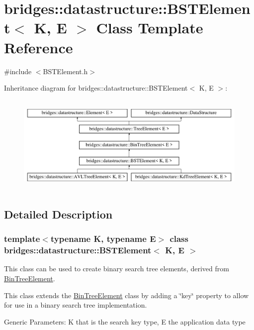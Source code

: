 \hypertarget{classbridges_1_1datastructure_1_1_b_s_t_element}{}\section{bridges\+::datastructure\+::B\+S\+T\+Element$<$ K, E $>$ Class Template Reference}
\label{classbridges_1_1datastructure_1_1_b_s_t_element}


{\ttfamily \#include $<$B\+S\+T\+Element.\+h$>$}

Inheritance diagram for bridges\+::datastructure\+::B\+S\+T\+Element$<$ K, E $>$\+:\begin{figure}[H]
\begin{center}
\leavevmode
\includegraphics[height=4.794520cm]{classbridges_1_1datastructure_1_1_b_s_t_element}
\end{center}
\end{figure}


\subsection{Detailed Description}
\subsubsection*{template$<$typename K, typename E$>$\newline
class bridges\+::datastructure\+::\+B\+S\+T\+Element$<$ K, E $>$}

This class can be used to create binary search tree elements, derived from \mbox{\hyperlink{classbridges_1_1datastructure_1_1_bin_tree_element}{Bin\+Tree\+Element}}. 

This class extends the \mbox{\hyperlink{classbridges_1_1datastructure_1_1_bin_tree_element}{Bin\+Tree\+Element}} class by adding a \char`\"{}key\char`\"{} property to allow for use in a binary search tree implementation.

Generic Parameters\+: K that is the search key type, E the application data type

